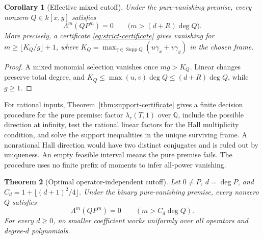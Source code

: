 \documentclass[11pt]{article}
\newtheorem{theorem}{Theorem}[section]
\newtheorem{corollary}[theorem]{Corollary}
\newcommand{\Q}{\mathbb Q}
\newcommand{\Supp}{\operatorname{Supp}}
\begin{document}
\begin{corollary}[Effective mixed cutoff]\label{cor:effective-cutoff}
Under the pure-vanishing premise, every nonzero $Q\in k[x,y]$ satisfies
\[
 \Lambda^m(QP^m)=0\qquad\bigl(m>(d+R)\deg Q\bigr).
\]
More precisely, a certificate \eqref{eq:strict-certificate} gives vanishing
for $m\geq\lfloor K_Q/g\rfloor+1$, where
$K_Q=\max_{\gamma\in\Supp Q}(u\gamma_x+v\gamma_y)$ in the chosen frame.
\end{corollary}

\begin{proof}
A mixed monomial selection vanishes once $mg>K_Q$.
Linear changes preserve total degree, and
$K_Q\leq\max(u,v)\deg Q\leq(d+R)\deg Q$, while $g\geq1$.
\end{proof}

For rational inputs, Theorem~\ref{thm:support-certificate} gives a finite
decision procedure for the pure premise: factor $\lambda_r(T,1)$ over
$\Q$, include the possible direction at infinity, test the rational
linear factors for the Hall multiplicity condition, and solve the support
inequalities in the unique surviving frame.  A nonrational Hall direction
would have two distinct conjugates and is ruled out by uniqueness.
An empty feasible interval means the pure premise fails.  The procedure
uses no finite prefix of moments to infer all-power vanishing.

\begin{theorem}[Optimal operator-independent cutoff]\label{thm:optimal-cutoff}
Let $0\ne P$, $d=\deg P$, and $C_d=1+\lfloor(d+1)^2/4\rfloor$.
Under the binary pure-vanishing premise, every nonzero $Q$ satisfies
\[
 \Lambda^m(QP^m)=0\qquad(m>C_d\deg Q).
\]
For every $d\ge0$, no smaller coefficient works uniformly over all
operators and degree-$d$ polynomials.
\end{theorem}
\end{document}
